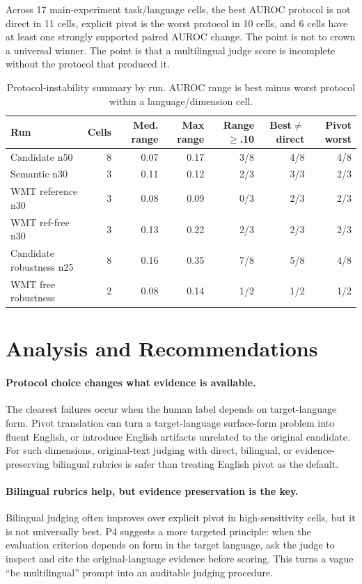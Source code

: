 \documentclass{article}
\begin{document}
Across 17 main-experiment task/language cells, the best AUROC protocol is not direct in 11 cells, explicit pivot is the worst protocol in 10 cells, and 6 cells have at least one strongly supported paired AUROC change. The point is not to crown a universal winner. The point is that a multilingual judge score is incomplete without the protocol that produced it.

\begin{table}[t]
\centering
\caption{Protocol-instability summary by run. AUROC range is best minus worst protocol within a language/dimension cell.}
\label{tab:protocol_instability_summary}
\small
\setlength{\tabcolsep}{3pt}
\begin{tabular*}{\linewidth}{@{\extracolsep{\fill}}lrrrrrr}
\toprule
Run & Cells & Med. range & Max range & Range$\geq$.10 & Best$\neq$direct & Pivot worst \\
\midrule
Candidate n50 & 8 & 0.07 & 0.17 & 3/8 & 4/8 & 4/8 \\
Semantic n30 & 3 & 0.11 & 0.12 & 2/3 & 3/3 & 2/3 \\
WMT reference n30 & 3 & 0.08 & 0.09 & 0/3 & 2/3 & 2/3 \\
WMT ref-free n30 & 3 & 0.13 & 0.22 & 2/3 & 2/3 & 2/3 \\
Candidate robustness n25 & 8 & 0.16 & 0.35 & 7/8 & 5/8 & 4/8 \\
WMT free robustness & 2 & 0.08 & 0.14 & 1/2 & 1/2 & 1/2 \\
\bottomrule
\end{tabular*}
\end{table}

\section{Analysis and Recommendations}

\paragraph{Protocol choice changes what evidence is available.}
The clearest failures occur when the human label depends on target-language form. Pivot translation can turn a target-language surface-form problem into fluent English, or introduce English artifacts unrelated to the original candidate. For such dimensions, original-text judging with direct, bilingual, or evidence-preserving bilingual rubrics is safer than treating English pivot as the default.

\paragraph{Bilingual rubrics help, but evidence preservation is the key.}
Bilingual judging often improves over explicit pivot in high-sensitivity cells, but it is not universally best. P4 suggests a more targeted principle: when the evaluation criterion depends on form in the target language, ask the judge to inspect and cite the original-language evidence before scoring. This turns a vague ``be multilingual'' prompt into an auditable judging procedure.
\end{document}
